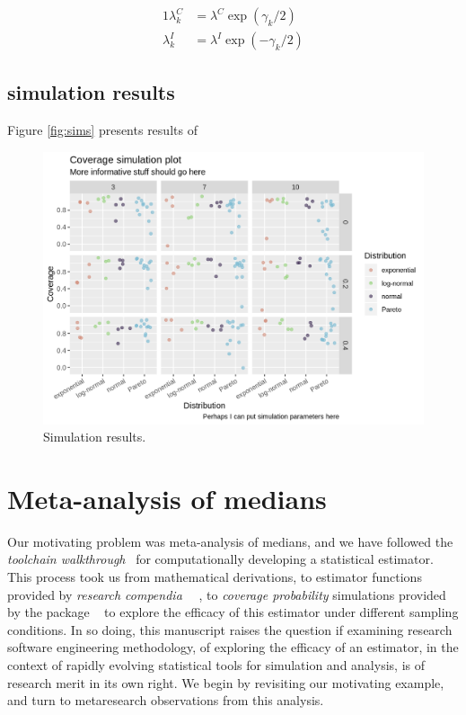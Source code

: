 \documentclass{article}
\begin{document}
\begin{alignat*}{1}
 \lambda_k^C & = \lambda^C  \exp(\gamma_k/2)\\
 \lambda_k^I & = \lambda^I  \exp(-\gamma_k/2)
\end{alignat*}



\subsection{simulation results}


Figure \ref{fig:sims} presents results of

\begin{figure}
   \includegraphics[width=\textwidth]{placeholder-coverage-plot.png}
   \caption{Simulation results.}
\end{figure}




\section{Meta-analysis of medians}

Our motivating problem was meta-analysis of medians, and we have followed the \emph{toolchain walkthrough}~\cite{gray2019textttcodeproof} for computationally developing a statistical estimator. This process took us from mathematical derivations, to estimator functions provided by \emph{research compendia}~\cite{grayTruthProofReproducibility2019} ~\cite{grayVarametaEstimatorsVariance2020}, to \emph{coverage probability} simulations provided by the package ~\cite{graySimetaSimulateMetaanalysis2020} to explore the efficacy of this estimator under different sampling conditions. In so doing, this manuscript raises the question if examining research software engineering methodology, of exploring the efficacy of an estimator, in the context of rapidly evolving statistical tools for simulation and analysis, is of research merit in its own right. We begin by revisiting our motivating example, and turn to metaresearch observations from this analysis.
\end{document}

